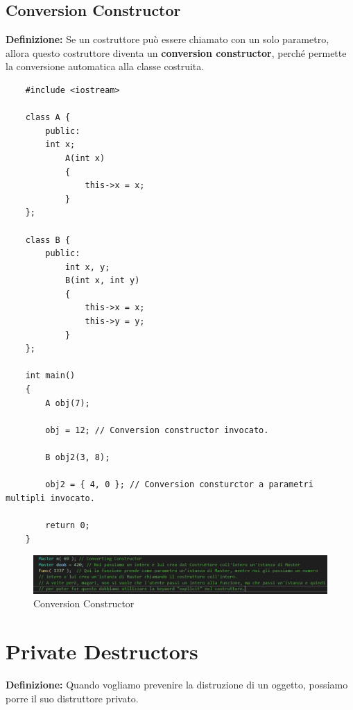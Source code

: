 \subsection{Conversion Constructor}

\textsf{\small \textbf{Definizione: } Se un costruttore può essere chiamato con un solo parametro, allora questo costruttore diventa un \textbf{conversion constructor}, perché permette la conversione automatica alla classe costruita.} \\

\begin{lstlisting}
	#include <iostream>
	
	class A {
		public:
		int x;
			A(int x)
			{
				this->x = x;	
			}
	};

	class B {
		public:
			int x, y;
			B(int x, int y)
			{
				this->x = x;
				this->y = y;
			}
	};

	int main()
	{
		A obj(7);
		
		obj = 12; // Conversion constructor invocato.
		
		B obj2(3, 8);
		
		obj2 = { 4, 0 }; // Conversion consturctor a parametri multipli invocato.
		
		return 0;
	}	
\end{lstlisting}

\begin{figure}[H]
	\centering
	\includegraphics[width=1.3\textwidth, height=1.3\textheight, keepaspectratio]{./imgs/Conversion_Constructor.png}
	\caption{Conversion Constructor}
	\label{fig:Conversion_Constructor}
\end{figure}


\section{Private Destructors} %

\textsf{\small \textbf{Definizione: } Quando vogliamo prevenire la distruzione di un oggetto, possiamo porre il suo distruttore privato.} \\

